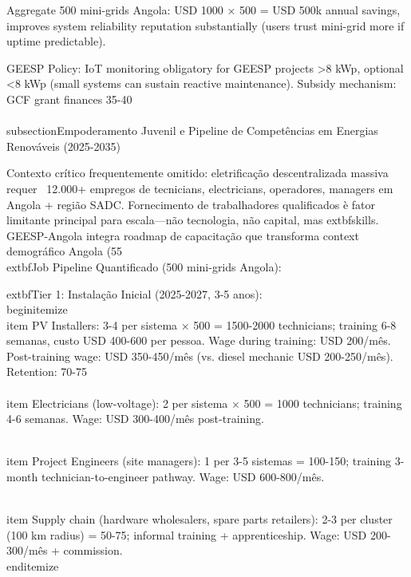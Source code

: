 \documentclass[12pt, a4paper]{article}
\begin{document}
{{{{{{{{{{{{Aggregate 500 mini-grids Angola: USD 1000 × 500 = USD 500k annual savings, improves system reliability reputation substantially (users trust mini-grid more if uptime predictable).

GEESP Policy: IoT monitoring obligatory for GEESP projects >8 kWp, optional <8 kWp (small systems can sustain reactive maintenance). Subsidy mechanism: GCF grant finances 35-40\\%

\\subsection{Empoderamento Juvenil e Pipeline de Competências em Energias Renováveis (2025-2035)}

Contexto crítico frequentemente omitido: eletrificação descentralizada massiva requer ~12.000+ empregos de tecnicians, electricians, operadores, managers em Angola + região SADC. Fornecimento de trabalhadores qualificados è fator limitante principal para escala—não tecnologia, não capital, mas 	extbf{skills}. GEESP-Angola integra roadmap de capacitação que transforma context demográfico Angola (55\\%

	extbf{Job Pipeline Quantificado (500 mini-grids Angola):}

	extbf{Tier 1: Instalação Inicial (2025-2027, 3-5 anos):}
\\begin{itemize}
\\item PV Installers: 3-4 per sistema × 500 = 1500-2000 technicians; training 6-8 semanas, custo USD 400-600 per pessoa. Wage during training: USD 200/mês. Post-training wage: USD 350-450/mês (vs. diesel mechanic USD 200-250/mês). Retention: 70-75\\%

\\item Electricians (low-voltage): 2 per sistema × 500 = 1000 technicians; training 4-6 semanas. Wage: USD 300-400/mês post-training.

\\item Project Engineers (site managers): 1 per 3-5 sistemas = 100-150; training 3-month technician-to-engineer pathway. Wage: USD 600-800/mês.

\\item Supply chain (hardware wholesalers, spare parts retailers): 2-3 per cluster (100 km radius) = 50-75; informal training + apprenticeship. Wage: USD 200-300/mês + commission.
\\end{itemize}

}}}}}}}}}}}}
\end{document}

